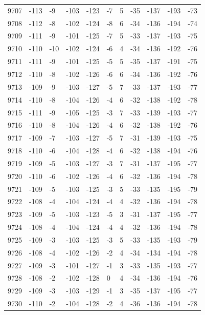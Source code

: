 \begin{table}[H]
\begin{tabular}{lllllllllll}
9707 & -113 & -9 & -103 & -123 & -7 & 5 & -35 & -137 & -193 & -73 \\
9708 & -112 & -8 & -102 & -124 & -8 & 6 & -34 & -136 & -194 & -74 \\
9709 & -111 & -9 & -101 & -125 & -7 & 5 & -33 & -137 & -193 & -75 \\
9710 & -110 & -10 & -102 & -124 & -6 & 4 & -34 & -136 & -192 & -76 \\
9711 & -111 & -9 & -101 & -125 & -5 & 5 & -35 & -137 & -191 & -75 \\
9712 & -110 & -8 & -102 & -126 & -6 & 6 & -34 & -136 & -192 & -76 \\
9713 & -109 & -9 & -103 & -127 & -5 & 7 & -33 & -137 & -193 & -77 \\
9714 & -110 & -8 & -104 & -126 & -4 & 6 & -32 & -138 & -192 & -78 \\
9715 & -111 & -9 & -105 & -125 & -3 & 7 & -33 & -139 & -193 & -77 \\
9716 & -110 & -8 & -104 & -126 & -4 & 6 & -32 & -138 & -192 & -76 \\
9717 & -109 & -7 & -103 & -127 & -5 & 7 & -31 & -139 & -193 & -75 \\
9718 & -110 & -6 & -104 & -128 & -4 & 6 & -32 & -138 & -194 & -76 \\
9719 & -109 & -5 & -103 & -127 & -3 & 7 & -31 & -137 & -195 & -77 \\
9720 & -110 & -6 & -102 & -126 & -4 & 6 & -32 & -136 & -194 & -78 \\
9721 & -109 & -5 & -103 & -125 & -3 & 5 & -33 & -135 & -195 & -79 \\
9722 & -108 & -4 & -104 & -124 & -4 & 4 & -32 & -136 & -194 & -78 \\
9723 & -109 & -5 & -103 & -123 & -5 & 3 & -31 & -137 & -195 & -77 \\
9724 & -108 & -4 & -104 & -124 & -4 & 4 & -32 & -136 & -194 & -78 \\
9725 & -109 & -3 & -103 & -125 & -3 & 5 & -33 & -135 & -193 & -79 \\
9726 & -108 & -4 & -102 & -126 & -2 & 4 & -34 & -134 & -194 & -78 \\
9727 & -109 & -3 & -101 & -127 & -1 & 3 & -33 & -135 & -193 & -77 \\
9728 & -108 & -2 & -102 & -128 & 0 & 4 & -34 & -136 & -194 & -76 \\
9729 & -109 & -3 & -103 & -129 & -1 & 3 & -35 & -137 & -195 & -77 \\
9730 & -110 & -2 & -104 & -128 & -2 & 4 & -36 & -136 & -194 & -78 \\

\end{tabular}
\end{table}
